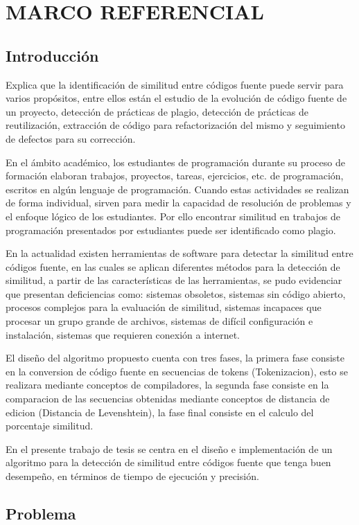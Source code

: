 \chapter{MARCO REFERENCIAL}
\section{Introducción}
\cite{Cheers2021} Explica que la identificación de similitud entre códigos fuente puede servir para varios propósitos, entre ellos están el estudio de la evolución de código fuente de un proyecto, detección de prácticas de plagio, detección de prácticas de reutilización, extracción de código para refactorización del mismo y seguimiento de defectos para su corrección.

En el ámbito académico, los estudiantes de programación durante su proceso de formación elaboran trabajos, proyectos, tareas, ejercicios, etc. de programación, escritos en algún lenguaje de programación. Cuando estas actividades se realizan de forma individual, sirven para medir la capacidad de resolución de problemas y el enfoque lógico de los estudiantes. Por ello encontrar similitud en trabajos de programación presentados por estudiantes puede ser identificado como plagio.

En la actualidad existen herramientas de software para detectar la similitud entre códigos fuente, en las cuales se aplican diferentes métodos para la detección de similitud, a partir de las características de las herramientas, se pudo evidenciar que presentan deficiencias como: sistemas obsoletos, sistemas sin código abierto, procesos complejos para la evaluación de similitud, sistemas incapaces que procesar un grupo grande de archivos, sistemas de difícil configuración e instalación, sistemas que requieren conexión a internet.

El diseño del algoritmo propuesto cuenta con tres fases, la primera fase consiste en la conversion de código fuente en secuencias de tokens (Tokenizacion), esto se realizara mediante conceptos de compiladores, la segunda fase consiste en la comparacion de las secuencias obtenidas mediante conceptos de distancia de edicion (Distancia de Levenshtein), la fase final consiste en el calculo del porcentaje similitud.

En el presente trabajo de tesis se centra en el diseño e implementación de un algoritmo para la detección de similitud entre códigos fuente que tenga buen desempeño, en términos de tiempo de ejecución y precisión.

\section{Problema}
